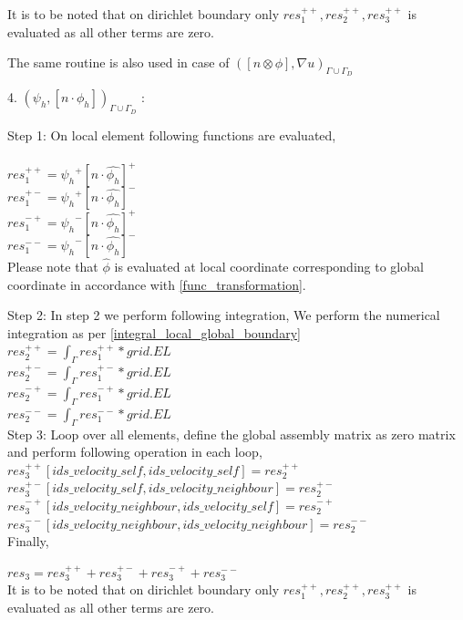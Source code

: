 \documentclass[a4paper,12pt]{book}
\begin{document}
It is to be noted that on dirichlet boundary only $res_1^{++}, res_2^{++}, res_3^{++}$ is evaluated as all other terms are zero.

The same routine is also used in case of $([n \otimes \phi],{\nabla u})_{\Gamma \cup \Gamma_D}$

4. $({\psi_h}, [n \cdot \phi_h])_{\Gamma \cup \Gamma_D}$ :

Step 1: On local element following functions are evaluated,\\
\\
$res_1^{++} = {\psi_h}^+ [n \cdot \hat{\phi_h}]^+$\\
$res_1^{+-} = {\psi_h}^+ [n \cdot \hat{\phi_h}]^-$\\
$res_1^{-+} = {\psi_h}^- [n \cdot \hat{\phi_h}]^+$\\
$res_1^{--} = {\psi_h}^- [n \cdot \hat{\phi_h}]^-$\\

Please note that $\hat{\phi}$ is evaluated at local coordinate corresponding to global coordinate in accordance with \ref{func_transformation}.

Step 2: In step 2 we perform following integration, 
We perform the numerical integration as per \ref{integral_local_global_boundary}
\\ 
$res_2^{++} = \int_{\Gamma} res_1^{++} * grid.EL$\\
$res_2^{+-} = \int_{\Gamma} res_1^{+-} * grid.EL$\\
$res_2^{-+} = \int_{\Gamma} res_1^{-+} * grid.EL$\\
$res_2^{--} = \int_{\Gamma} res_1^{--} * grid.EL$\\

Step 3: Loop over all elements, define the global assembly matrix as zero matrix and perform following operation in each loop,
\\
$res_3^{++}[ids\_velocity\_self,ids\_velocity\_self] = res_2^{++}$\\
$res_3^{+-}[ids\_velocity\_self,ids\_velocity\_neighbour] = res_2^{+-}$\\
$res_3^{-+}[ids\_velocity\_neighbour,ids\_velocity\_self] = res_2^{-+}$\\
$res_3^{--}[ids\_velocity\_neighbour,ids\_velocity\_neighbour] = res_2^{--}$\\

Finally,

$res_3 = res_3^{++} + res_3^{+-} + res_3^{-+} + res_3^{--}$\\

It is to be noted that on dirichlet boundary only $res_1^{++}, res_2^{++}, res_3^{++}$ is evaluated as all other terms are zero.
\end{document}
